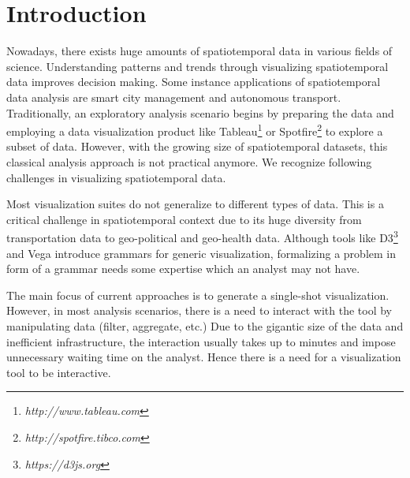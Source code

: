 \documentclass[runningheads,a4paper]{llncs}
\begin{document}
\section{Introduction}
Nowadays, there exists huge amounts of spatiotemporal data in various fields of science. Understanding patterns and trends through visualizing spatiotemporal data improves decision making. Some instance applications of spatiotemporal data analysis are smart city management and autonomous transport. Traditionally, an exploratory analysis scenario begins by preparing the data and employing a data visualization product like Tableau\footnote{\it http://www.tableau.com} or Spotfire\footnote{\it http://spotfire.tibco.com} to explore a subset of data. However, with the growing size of spatiotemporal datasets, this classical analysis approach is not practical anymore. We recognize following challenges in visualizing spatiotemporal data.



 Most visualization suites do not generalize to different types of data. This is a critical challenge in spatiotemporal context due to its huge diversity from transportation data to geo-political and geo-health data. Although tools like {\sc D3}\footnote{\it https://d3js.org} and {\sc Vega} \cite{satyanarayan2016reactive} introduce grammars for generic visualization, formalizing a problem in form of a grammar needs some expertise which an analyst may not have.

 The main focus of current approaches is to generate a single-shot visualization. However, in most analysis scenarios, there is a need to interact with the tool by manipulating data (filter, aggregate, etc.) Due to the gigantic size of the data and inefficient infrastructure, the interaction usually takes up to minutes and impose unnecessary waiting time on the analyst. Hence there is a need for a visualization tool to be interactive.
\end{document}
